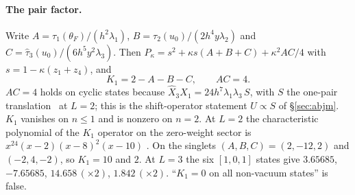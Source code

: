 \paragraph{The pair factor.} Write $A=\tau_1(\theta_F)/(h^2\lambda_1)$, $B=\tau_2(u_0)/(2h^4y\lambda_2)$ and
$C=\hat\tau_3(u_0)/(6h^5y^2\lambda_3)$. Then $P_\kappa=s^2+\kappa s(A+B+C)+\kappa^2AC/4$ with $s=1-\kappa(z_1+z_4)$, and
\begin{equation}
 K_1=2-A-B-C,\qquad AC=4 .
\end{equation}
$AC=4$ holds on cyclic states because $\hat X_3X_1=24h^7\lambda_1\lambda_3\,S$, with $S$ the one-pair translation \ex\ at $L=2$; this is
the shift-operator statement $U\propto S$ of \S\ref{sec:abjm}. $K_1$ vanishes on $n\le1$ and is nonzero on $n=2$. At $L=2$ the
characteristic polynomial of the $K_1$ operator on the zero-weight sector is $x^{24}(x-2)(x-8)^2(x-10)$ \ex. On the singlets
$(A,B,C)=(2,-12,2)$ and $(-2,4,-2)$, so $K_1=10$ and $2$. At $L=3$ the six $[1,0,1]$ states give $3.65685$, $-7.65685$,
$14.658\,(\times2)$, $1.842\,(\times2)$. ``$K_1=0$ on all non-vacuum states'' is false.

